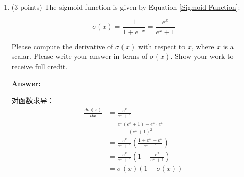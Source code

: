 \documentclass{article}
\newenvironment{answer}{
    {\bf Answer:} \sf \begingroup \color{red}%
}{\par\endgroup}%
\begin{document}
\begin{enumerate}[label=(\alph*)]
Where $x$ is a scalar and $0<\alpha <1$, please compute the derivative of $f(x)$ with respect to $x$. You may ignore the case where the derivative is not defined at 0.\footnote{If you're interested in how to handle the derivative at this point, you can read more about the notion of \hyperref[https://en.wikipedia.org/wiki/Subderivative]{subderivatives}.}

\begin{shaded}
\begin{answer}
当x>0时，
\begin{equation}
	\frac{\partial f(x)}{\partial x} = \frac{\partial x}{x} = 1
\end{equation}

当x<0时，
\begin{equation}
	\frac{\partial f(x)}{\partial x} = \frac{\partial \alpha x}{x} = \alpha
\end{equation}

综上，
\begin{equation}
	\frac{\partial f(x)}{\partial x} =  \left\{ 
	\begin{array}{c}
		1 , x>0 \\
		\alpha, x<0
	\end{array}
	\right.
\end{equation}
\end{answer}
\end{shaded}

\item (3 points) The sigmoid function is given by Equation \ref{Sigmoid Function}:

\begin{equation}
    \label{Sigmoid Function}
    \sigma (x) = \frac{1}{1 + e^{-x}} = \frac{e^{x}}{e^{x} + 1}
\end{equation}

Please compute the derivative of $\sigma(x)$ with respect to $x$, where $x$ is a scalar. Please write your answer in terms of $\sigma(x)$. Show your work to receive full credit.

\begin{shaded}
\begin{answer}
对函数求导：
\begin{equation}
\begin{array}{ll}
		\frac{d \sigma(x)}{d x} &= \frac{e^x}{e^x+1} \\
			&= \frac{e^x(e^x+1)-e^x \cdot e^x}{(e^x+1)^2} \\
			&= \frac{e^x}{e^x+1} (\frac{1+e^x-e^x}{e^x+1}) \\
			&= \frac{e^x}{e^x+1} (1-\frac{e^x}{e^x+1}) \\
			&= \sigma(x) (1-\sigma(x))
\end{array}
\end{equation}
\end{answer}
\end{shaded}


\end{enumerate}
\end{document}
